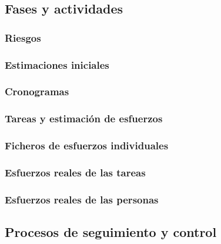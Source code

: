 \documentclass[10pt,spanish]{article}
\begin{document}
\subsection{Fases y actividades}


\subsubsection{Riesgos}


\subsubsection{Estimaciones iniciales}


\subsubsection{Cronogramas}


\subsubsection{Tareas y estimación de esfuerzos}


\subsubsection{Ficheros de esfuerzos individuales}


\subsubsection{Esfuerzos reales de las tareas}


\subsubsection{Esfuerzos reales de las personas}


\subsection{Procesos de seguimiento y control}

\end{document}
